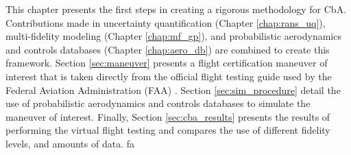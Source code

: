 This chapter presents the first steps in creating a rigorous methodology for CbA.
Contributions made in uncertainty quantification (Chapter \ref{chap:rans_uq}), multi-fidelity modeling (Chapter \ref{chap:mf_gp}), and probabilistic aerodynamics and controls databases (Chapter \ref{chap:aero_db}) are combined to create this framework.
Section \ref{sec:maneuver} presents a flight certification maneuver of interest that is taken directly from the official flight testing guide used by the Federal Aviation Administration (FAA) \cite{romanowski_flight_2018}.
Section \ref{sec:sim_procedure} detail the use of probabilistic aerodynamics and controls databases to simulate the maneuver of interest.
Finally, Section \ref{sec:cba_results} presents the results of performing the virtual flight testing and compares the use of different fidelity levels, and amounts of data. 
 fa
 